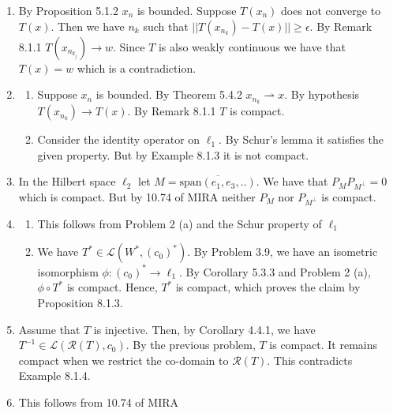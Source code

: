 \documentclass{article}
\begin{document}
\begin{enumerate}
    \item By Proposition 5.1.2 $x_n$ is bounded. Suppose $T(x_n)$ does not converge to $T(x)$. Then we have $n_k$ such that $||T(x_{n_k})-T(x)|| \geq \epsilon$. By Remark 8.1.1 $T(x_{n_{k_j}}) \to w$. Since $T$ is also weakly continuous we have that $T(x)=w$ which is a contradiction.
    
    \item \begin{enumerate}
        \item Suppose $x_n$ is bounded. By Theorem 5.4.2 $x_{n_k} \rightharpoonup x$. By hypothesis $T(x_{n_k}) \to T(x)$. By Remark 8.1.1 $T$ is compact.

        \item Consider the identity operator on $\ell_1$. By Schur's lemma it satisfies the given property. But by Example 8.1.3 it is not compact.
    \end{enumerate}
    
    \item In the Hilbert space $\ell_2$ let $M=\overline{\text{span}(e_1,e_3,..)}$. We have that $P_MP_{M^\perp}=0$ which is compact. But by 10.74 of MIRA neither $P_M$ nor $P_{M^\perp}$ is compact.
    
    \item 
    
    \begin{enumerate}
        
        \item This follows from Problem 2 (a) and the Schur property of $\ell_1$

        \item We have $T^* \in \mathcal{L}(W^*,(c_0)^*)$. By Problem 3.9, we have an isometric isomorphism $\phi:(c_0)^* \to \ell_1$. By Corollary 5.3.3 and Problem 2 (a), $\phi \circ T^*$ is compact. Hence, $T^*$ is compact, which proves the claim by Proposition 8.1.3.
    
    \end{enumerate}
    
    \item Assume that $T$ is injective. Then, by Corollary 4.4.1, we have $T^{-1} \in \mathcal{L}(\mathcal{R}(T),c_0)$. By the previous problem, $T$ is compact. It remains compact when we restrict the co-domain to $\mathcal{R}(T)$. This contradicts Example 8.1.4.
    
    \item This follows from 10.74 of MIRA
    

\end{enumerate}
\end{document}
